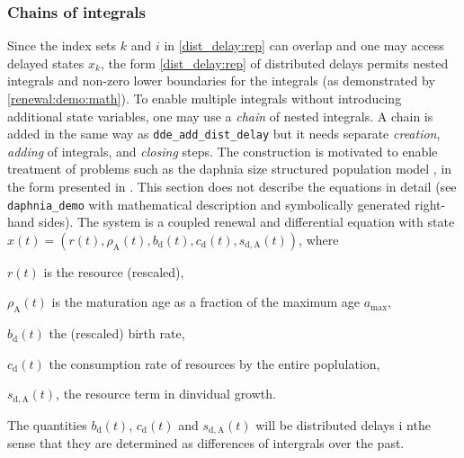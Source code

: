 \documentclass[10pt]{scrartcl}
\newcommand{\blist}[1]{\mbox{\lstinline!#1!}}
\begin{document}
\subsubsection{Chains of integrals}
\label{sec:chain:delay}
Since the index sets $k$ and $i$ in \eqref{dist_delay:rep} can overlap and
one may access delayed states $x_k$, the form \eqref{dist_delay:rep} of
distributed delays permits nested integrals and non-zero lower
boundaries for the integrals (as demonstrated by
\eqref{renewal:demo:math}). To enable multiple integrals without
introducing additional state variables, one may use a \emph{chain} of
nested integrals. A chain is added in the same way as
\blist{dde_add_dist_delay} but it needs separate \emph{creation},
\emph{adding} of integrals, and \emph{closing} steps. The construction
is motivated to enable treatment of problems such as the daphnia size
structured population model \cite{diekmann2010daphnia}, in the form
presented in \cite{ando2020collocation}. This section does not
describe the equations in detail (see \texttt{daphnia\_demo} with
mathematical description and symbolically generated right-hand sides).
The system is a coupled renewal and differential equation with state
$x(t)=(r(t),\rho_\mathrm{A}(t),b_\mathrm{d}(t),c_\mathrm{d}(t),s_\mathrm{d,A}(t))$, where
\begin{compactitem}
\item $r(t)$ is the resource (rescaled),
\item $\rho_\mathrm{A}(t)$ is the maturation age as a fraction of the maximum age $a_{\max}$,
\item $b_\mathrm{d}(t)$ the (rescaled) birth rate,
\item $c_\mathrm{d}(t)$ the consumption rate of resources by the entire poplulation,
\item $s_\mathrm{d,A}(t)$, the resource term in dinvidual growth.
\end{compactitem}
The quantities $b_\mathrm{d}(t)$, $c_\mathrm{d}(t)$ and
$s_\mathrm{d,A}(t)$ will be distributed delays i nthe sense that they
are determined as differences of intergrals over the past.
\end{document}
